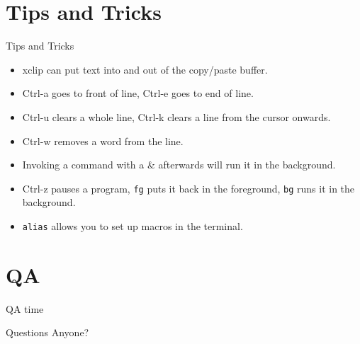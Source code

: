 \documentclass[10pt]{beamer}
\begin{document}
\section{Tips and Tricks}
\begin{frame}{Tips and Tricks}
\begin{itemize}
\item xclip can put text into and out of the copy/paste buffer.
\item Ctrl-a goes to front of line, Ctrl-e goes to end of line.
\item Ctrl-u clears a whole line, Ctrl-k clears a line from the cursor onwards.
\item Ctrl-w removes a word from the line.
\item Invoking a command with a \& afterwards will run it in the background.
\item Ctrl-z pauses a program, \texttt{\color{blue}fg} puts it back in the foreground, \texttt{\color{blue}bg} runs it in the background.
\item \texttt{\color{blue}alias} allows you to set up macros in the terminal.
\end{itemize}
\end{frame}

\section{QA}
\begin{frame}{QA time}
  \begin{center}
    Questions Anyone?
  \end{center}
\end{frame}
\end{document}
